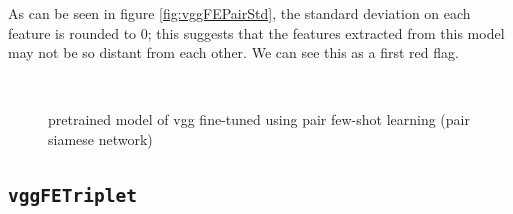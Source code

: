 \documentclass{article}
\begin{document}
As can be seen in figure \ref{fig:vggFEPairStd}, the standard deviation on each feature is rounded to 0; this suggests that the features extracted from this model may not be so distant from each other. We can see this as a first red flag.

\begin{figure}[H]
    \centering
    \\
    \caption{pretrained model of vgg fine-tuned using pair few-shot learning (pair siamese network)}
    \label{fig:vggFEPairRes}
\end{figure}

\subsection{\texttt{vggFETriplet}}
\end{document}
